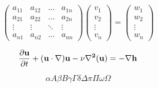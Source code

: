 \documentclass[]{article}
\begin{document}
\begin{equation*}
\begin{pmatrix}
a_{11}&a_{12}&\dots&a_{1n}\\
a_{21}&a_{22}&\dots&a_{2n}\\
\vdots&\vdots&\ddots&\vdots\\
a_{n1}&a_{n2}&\dots&a_{nn}
\end{pmatrix}
\begin{pmatrix}
v_{1}\\
v_{2}\\
\vdots\\
v_{n}
\end{pmatrix}
=
\begin{pmatrix}
w_{1}\\
w_{2}\\
\vdots\\
w_{n}
\end{pmatrix}
\end{equation*}

\begin{equation*}
\frac{\partial{\bf{u}}}{\partial{t}}+(\bf{u}\cdot\nabla)\bf{u}-\nu\nabla^2\bf(u)=-\nabla h
\end{equation*}

\[             %
\alpha A \beta B \gamma \Gamma \delta \Delta \pi \Pi \omega \Omega 
\]
\end{document}
